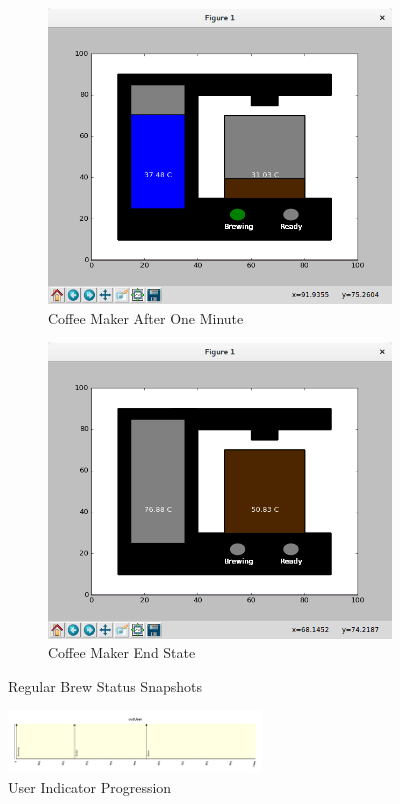 \documentclass[10pt]{article}
\begin{document}
\begin{center}
  \begin{figure}[H]
    \begin{subfigure}{.5\textwidth}
      \centering
      \includegraphics[width=.8\linewidth]{input/test-1-prog}
      \caption{Coffee Maker After One Minute}
      \label{fig:test-1-prog}
    \end{subfigure}%
    \begin{subfigure}{.5\textwidth}
      \centering
      \includegraphics[width=.8\linewidth]{input/test-1}
      \caption{Coffee Maker End State}
      \label{fig:test-1}
    \end{subfigure}
  \caption{Regular Brew Status Snapshots}
  \end{figure}
\end{center}
\begin{center}
  \begin{figure}[H]
    \begin{center}
      \includegraphics[width=0.6\textwidth]{input/test-1-plot}
      \caption{User Indicator Progression}
      \label{ref:test-1-plot}
    \end{center}
  \end{figure}
\end{center}
\end{document}
